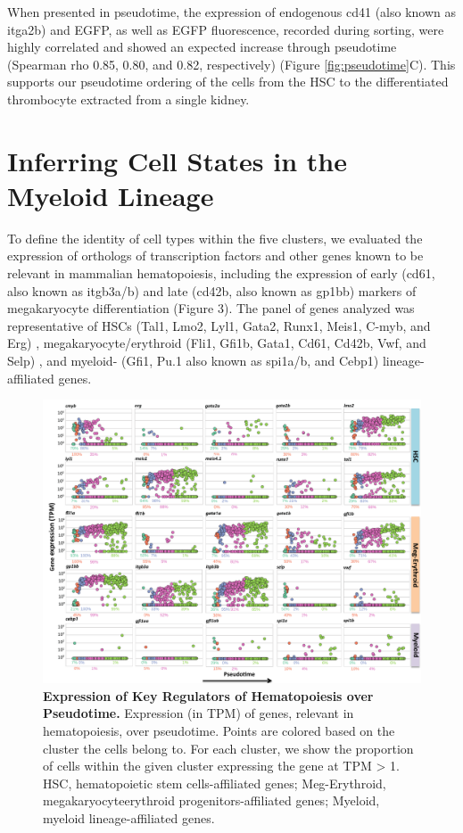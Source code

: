 When presented in pseudotime, the expression of endogenous cd41 (also known as itga2b) and EGFP, as well as EGFP fluorescence, recorded during sorting, were highly correlated and showed an expected increase through pseudotime (Spearman rho 0.85, 0.80, and 0.82, respectively) (Figure \ref{fig:pseudotime}C). This supports our pseudotime ordering of the cells from the HSC to the differentiated thrombocyte extracted from a single kidney.

\section{Inferring Cell States in the Myeloid Lineage}

To define the identity of cell types within the five clusters, we evaluated the expression of orthologs of transcription factors and other genes known to be relevant in mammalian hematopoiesis, including the expression of early (cd61, also known as itgb3a/b) and late (cd42b, also known as gp1bb) markers of megakaryocyte differentiation (Figure 3). The panel of genes analyzed was representative of HSCs (Tal1, Lmo2, Lyl1, Gata2, Runx1, Meis1, C-myb, and Erg)  \cite{Capron2006-mp, Greig2008-ab, Loughran2008-el, Orkin2008-os, Pineault2002-kl}, megakaryocyte/erythroid (Fli1, Gfi1b, Gata1, Cd61, Cd42b, Vwf, and Selp)  \cite{Clay2001-fa, Orkin2008-os, Poirault-Chassac2010-bf, Schick1993-lj}, and myeloid- (Gfi1, Pu.1 also known as spi1a/b, and Cebp1)  \cite{Tenen1997-dr, Zeng2004-dh} lineage-affiliated genes.

\begin{figure}
    \centering
    \includegraphics[width=\textwidth]{"Figure3"}
    \caption[Expression of Key Regulators of Hematopoiesis over Pseudotime]{\textbf{Expression of Key Regulators of Hematopoiesis over Pseudotime.} Expression (in TPM) of genes, relevant in hematopoiesis, over pseudotime. Points are colored based on the cluster the cells belong to. For each cluster, we show the proportion of cells within the given cluster expressing the gene at TPM > 1. HSC, hematopoietic stem cells-affiliated genes; Meg-Erythroid, megakaryocyteerythroid progenitors-affiliated genes; Myeloid, myeloid lineage-affiliated genes.}
    \label{fig:genes}
\end{figure}

